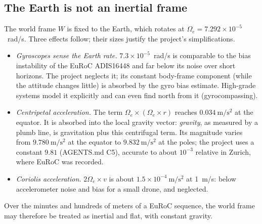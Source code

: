 \subsection{The Earth is not an inertial frame}

The world frame $W$ is fixed to the Earth, which rotates at $\Omega_e = 7.292\times10^{-5}$~rad/s. Three effects follow; their sizes justify the
project's simplifications.
\begin{itemize}
  \item \emph{Gyroscopes sense the Earth rate.} $7.3\times10^{-5}$~rad/s is comparable to the bias instability of the EuRoC ADIS16448 and far below its
        noise over short horizons. The project neglects it; its constant body-frame component (while the attitude changes little) is absorbed
        by the gyro bias estimate. High-grade systems model it explicitly and can even find north from it (gyrocompassing).
  \item \emph{Centripetal acceleration.} The term $\Omega_e\times(\Omega_e\times r)$ reaches $0.034~\mathrm{m/s^2}$ at the equator. It is absorbed into the
        local gravity vector: \emph{gravity}, as measured by a plumb line, is gravitation plus this centrifugal term. Its magnitude varies from
        $9.780~\mathrm{m/s^2}$ at the equator to $9.832~\mathrm{m/s^2}$ at the poles; the project uses a constant $9.81$ (AGENTS.md C5), accurate to about
        $10^{-3}$ relative in Zurich, where EuRoC was recorded.
  \item \emph{Coriolis acceleration.} $2\Omega_e\times v$ is about $1.5\times10^{-4}~\mathrm{m/s^2}$ at 1~m/s: below accelerometer noise and bias for a small
        drone, and neglected.
\end{itemize}
Over the minutes and hundreds of meters of a EuRoC sequence, the world frame may therefore be treated as inertial and flat, with constant
gravity.

